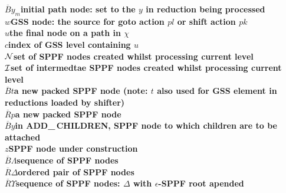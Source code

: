 \documentclass{article}
\newcommand{\NR}{\small\bf $\overline{R}$}
\newcommand{\NB}{\small\bf $\overline{B}$}
\begin{document}
\begin{tabbing}
\NB\>\>$y_m$\>initial path node: set to the $y$ in reduction being
processed\\[2ex]
\>\>$w$\>GSS node:
the source for goto action $pl$ or shift action $pk$\\
\>\>$u$\>the final node on a path in $\chi$\\
\>\>$c$\>index of GSS level containing $u$\\ 
\>$\cal N$\>\>set of SPPF nodes created whilst processing current level\\
\>$\cal I$\>\>set of intermedtae SPPF nodes created whilst processing
current level\\
\NB\>$t$\>\>a new packed SPPF node (note: $t$  also used for GSS element in
reductions loaded by shifter)\\
\NR\>$p$\>\>a new packed SPPF node\\
\NB\>$y$\>\>in ADD\_\,CHILDREN, SPPF node to which children are to be attached\\
\>$z$\>\>SPPF node under construction\\[2ex]
\NB\>$\Lambda$\>\>sequence of SPPF nodes\\
\NR\>$\Delta$\>\>ordered pair of SPPF nodes\\
\NR\>$\Upsilon$\>\>sequence of SPPF nodes: $\Delta$ with $\epsilon$-SPPF
root apended\\
\end{tabbing}
\end{document}
